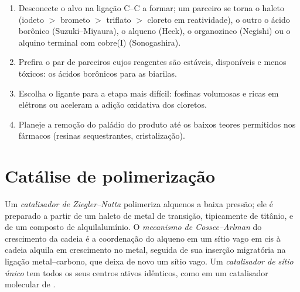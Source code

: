 \begin{method}\label{met:b3:homogeneous-catalysis:choose-coupling}
\begin{enumerate}
  \item Desconecte o alvo na ligação C--C a formar; um parceiro se torna o
        haleto (iodeto $>$ brometo $>$ triflato $>$ cloreto em reatividade), o outro o
        ácido borônico (Suzuki--Miyaura), o alqueno (Heck), o organozinco
        (Negishi) ou o alquino terminal com cobre(I) (Sonogashira).
  \item Prefira o par de parceiros cujos reagentes são estáveis, disponíveis e menos
        tóxicos: os ácidos borônicos para as biarilas.
  \item Escolha o ligante para a etapa mais difícil: fosfinas volumosas e ricas em elétrons
        ou  aceleram a adição oxidativa dos cloretos.
  \item Planeje a remoção do paládio do produto até os baixos teores
        permitidos nos fármacos (resinas sequestrantes, cristalização).
\end{enumerate}
\end{method}

\section{Catálise de polimerização}

\begin{definition}\label{def:b3:homogeneous-catalysis:ziegler-natta}
Um \emph{catalisador de Ziegler--Natta} polimeriza
alquenos a baixa pressão; ele é preparado a partir de um haleto de metal de transição, tipicamente de
titânio, e de um composto de alquilalumínio. O \emph{mecanismo de
Cossee--Arlman} do crescimento da cadeia é a coordenação
do alqueno em um sítio vago em cis à cadeia alquila em crescimento no metal,
seguida de sua inserção migratória na ligação metal--carbono, que deixa de novo um
sítio vago. Um \emph{catalisador de sítio único} tem
todos os seus centros ativos idênticos, como em um catalisador molecular de .
\end{definition}


